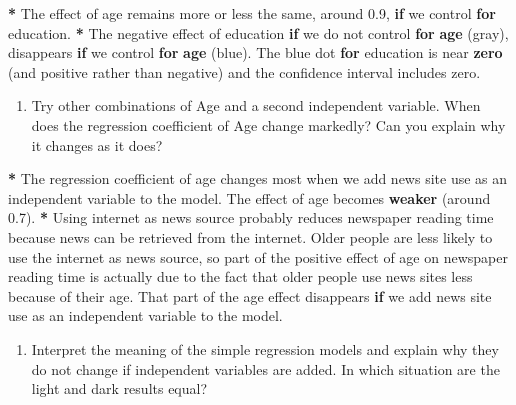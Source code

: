 \documentclass[a4paper]{book}
\newenvironment{Shaded}{\begin{snugshade}}{\end{snugshade}}
\newcommand{\KeywordTok}[1]{\textcolor[rgb]{0,0,0}{\textbf{#1}}}
\newcommand{\FloatTok}[1]{\textcolor[rgb]{0.00,0.00,0.00}{#1}}
\newcommand{\StringTok}[1]{\textcolor[rgb]{0.00,0.00,0.00}{#1}}
\newcommand{\ControlFlowTok}[1]{\textcolor[rgb]{0.00,0.00,0.00}{\textbf{#1}}}
\newcommand{\OperatorTok}[1]{\textcolor[rgb]{0.00,0.00,0.00}{\textbf{#1}}}
\newcommand{\NormalTok}[1]{#1}
\providecommand{\tightlist}{%
  \setlength{\itemsep}{0pt}\setlength{\parskip}{0pt}}
\theoremstyle{definition}
\theoremstyle{definition}
\theoremstyle{definition}
\theoremstyle{remark}
\begin{document}
\begin{Shaded}
\begin{Highlighting}[]
\OperatorTok{*}\StringTok{ }\NormalTok{The effect of age remains more or less the same, around }\FloatTok{0.9}\NormalTok{, }\ControlFlowTok{if}\NormalTok{ we control}
\ControlFlowTok{for}\NormalTok{ education.}
\OperatorTok{*}\StringTok{ }\NormalTok{The negative effect of education }\ControlFlowTok{if}\NormalTok{ we do not control }\ControlFlowTok{for} \KeywordTok{age}\NormalTok{ (gray),}
\NormalTok{disappears }\ControlFlowTok{if}\NormalTok{ we control }\ControlFlowTok{for} \KeywordTok{age}\NormalTok{ (blue). The blue dot }\ControlFlowTok{for}\NormalTok{ education is near}
\KeywordTok{zero}\NormalTok{ (and positive rather than negative) and the confidence interval includes}
\NormalTok{zero.}
\end{Highlighting}
\end{Shaded}

\begin{enumerate}
\def\labelenumi{\arabic{enumi}.}
\setcounter{enumi}{1}
\tightlist
\item
  Try other combinations of Age and a second independent variable. When
  does the regression coefficient of Age change markedly? Can you
  explain why it changes as it does?
\end{enumerate}

\begin{Shaded}
\begin{Highlighting}[]
\OperatorTok{*}\StringTok{ }\NormalTok{The regression coefficient of age changes most when we add news site use as}
\NormalTok{an independent variable to the model. The effect of age becomes }\KeywordTok{weaker}\NormalTok{ (around}
\FloatTok{0.7}\NormalTok{).}
\OperatorTok{*}\StringTok{ }\NormalTok{Using internet as news source probably reduces newspaper reading time because}
\NormalTok{news can be retrieved from the internet. Older people are less likely to use}
\NormalTok{the internet as news source, so part of the positive effect of age on newspaper}
\NormalTok{reading time is actually due to the fact that older people use news sites less}
\NormalTok{because of their age. That part of the age effect disappears }\ControlFlowTok{if}\NormalTok{ we add news}
\NormalTok{site use as an independent variable to the model.}
\end{Highlighting}
\end{Shaded}

\begin{enumerate}
\def\labelenumi{\arabic{enumi}.}
\setcounter{enumi}{2}
\tightlist
\item
  Interpret the meaning of the simple regression models and explain why
  they do not change if independent variables are added. In which
  situation are the light and dark results equal?
\end{enumerate}
\end{document}
